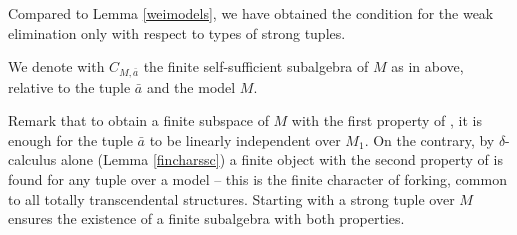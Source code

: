 %
%
%
%
%
%
%

Compared to Lemma \ref{weimodels}, we have obtained the condition for the weak elimination only with respect
to types of strong tuples.

We denote with $C_{M,\bar a}$ the finite self-sufficient subalgebra of $M$ as in  above, relative to the tuple $\bar a$ and
the model $M$.

Remark that to obtain a finite subspace of $M$ with the first property of , it is enough for the tuple $\bar a$ to be linearly independent over
$M_{1}$. On the contrary, by $\delta$-calculus alone (Lemma \ref{fincharssc}) a finite object with the second
property of  is found for any tuple over a model -- this is the finite character of forking,
common to all totally transcendental structures. Starting with a strong tuple over $M$ ensures the existence
of a finite subalgebra with both properties.

